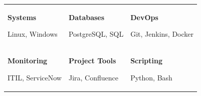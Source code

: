 \vspace{-4mm}


\begin{tabularx}{\textwidth}{@{}X X X@{}}

\begin{minipage}[t]{\linewidth}
\textbf{Systems}

Linux, Windows
\end{minipage}

&

\begin{minipage}[t]{\linewidth}
\textbf{Databases}

PostgreSQL, SQL
\end{minipage}

&

\begin{minipage}[t]{\linewidth}
\textbf{DevOps}

Git, Jenkins, Docker
\end{minipage}

\\[10mm]

\begin{minipage}[t]{\linewidth}
\textbf{Monitoring}

ITIL, ServiceNow
\end{minipage}

&

\begin{minipage}[t]{\linewidth}
\textbf{Project Tools}

Jira, Confluence
\end{minipage}

&

\begin{minipage}[t]{\linewidth}
\textbf{Scripting}

Python, Bash
\end{minipage}


\end{tabularx}
